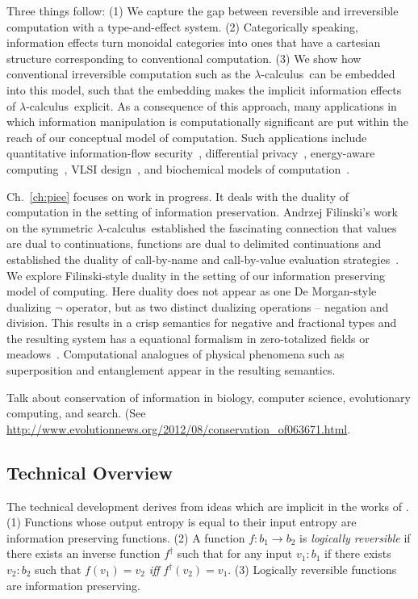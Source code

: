 \documentclass{article}
\newcommand{\lcal}{\ensuremath{\lambda}-calculus}
\begin{document}
Three things follow: (1) We capture the gap between reversible and
irreversible computation with a type-and-effect system. (2)
Categorically speaking, information effects turn monoidal categories
into ones that have a cartesian structure corresponding to
conventional computation.  (3) We show how conventional irreversible
computation such as the \lcal\ can be embedded into this model, such
that the embedding makes the implicit information effects of \lcal\
explicit.  As a consequence of this approach, many applications in
which information manipulation is computationally significant are put
within the reach of our conceptual model of computation. Such
applications include quantitative information-flow
security~\cite{myerssab}, differential
privacy~\cite{dwork:differential}, energy-aware
computing~\cite{1324180,605411}, VLSI
design~\cite{Macii:1996:ECE:874066.875828}, and biochemical models of
computation~\cite{bio}.

Ch.~\ref{ch:piee} focuses on work in progress. It deals with the
duality of computation in the setting of information
preservation. Andrzej Filinski's work on the symmetric
\lcal\ established the fascinating connection that values are dual to
continuations, functions are dual to delimited continuations and
established the duality of call-by-name and call-by-value evaluation
strategies~\cite{Filinski:1989:DCI:648332.755574}. We explore
Filinski-style duality in the setting of our information preserving
model of computing. Here duality does not appear as one De
Morgan-style dualizing $\neg$ operator, but as two distinct dualizing
operations -- negation and division. This results in a crisp semantics
for negative and fractional types and the resulting system has a
equational formalism in zero-totalized fields or
meadows~\cite{DBLP:journals/tcs/BergstraHT09}. Computational analogues
of physical phenomena such as superposition and entanglement appear in
the resulting semantics.

Talk about conservation of information in biology, computer science,
evolutionary computing, and search. (See
\url{http://www.evolutionnews.org/2012/08/conservation_of063671.html}.

\subsection{Technical Overview}

The technical development derives from ideas which are implicit in the
works of \cite{Toffoli:1980, Zuliani:2001:LR,
  malacaria2007assessing,ClarkHM07,Ghica:2007:GSS:1190216.1190269}.
(1) Functions whose output entropy is equal to their input entropy are
information preserving functions.  (2) A function
$f : b_1 \rightarrow b_2$ is \emph{logically reversible} if there
exists an inverse function $f^{\dagger}$ such that for any input
$v_1:b_1$ if there exists $v_2:b_2$ such that $f(v_1)=v_2$ \emph{iff}
$f^{\dagger}(v_2)=v_1$.  (3) Logically reversible functions are
information preserving.
\end{document}
